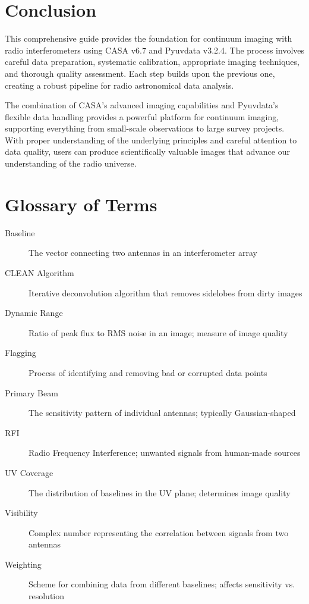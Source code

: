 \documentclass[11pt]{article}
\begin{document}
\section{Conclusion}

This comprehensive guide provides the foundation for continuum imaging with radio interferometers using CASA v6.7 and Pyuvdata v3.2.4. The process involves careful data preparation, systematic calibration, appropriate imaging techniques, and thorough quality assessment. Each step builds upon the previous one, creating a robust pipeline for radio astronomical data analysis.

The combination of CASA's advanced imaging capabilities and Pyuvdata's flexible data handling provides a powerful platform for continuum imaging, supporting everything from small-scale observations to large survey projects. With proper understanding of the underlying principles and careful attention to data quality, users can produce scientifically valuable images that advance our understanding of the radio universe.

\section{Glossary of Terms}

\begin{description}
    \item[Baseline] The vector connecting two antennas in an interferometer array
    \item[CLEAN Algorithm] Iterative deconvolution algorithm that removes sidelobes from dirty images
    \item[Dynamic Range] Ratio of peak flux to RMS noise in an image; measure of image quality
    \item[Flagging] Process of identifying and removing bad or corrupted data points
    \item[Primary Beam] The sensitivity pattern of individual antennas; typically Gaussian-shaped
    \item[RFI] Radio Frequency Interference; unwanted signals from human-made sources
    \item[UV Coverage] The distribution of baselines in the UV plane; determines image quality
    \item[Visibility] Complex number representing the correlation between signals from two antennas
    \item[Weighting] Scheme for combining data from different baselines; affects sensitivity vs. resolution
\end{description}
\end{document}
